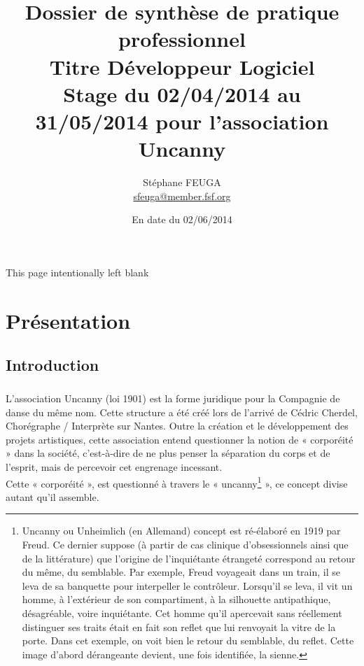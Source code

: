 \documentclass[11pt,a4paper,twoside]{report}
\author{Stéphane FEUGA\\{\small \href{mailto:sfeuga@member.fsf.org}{sfeuga@member.fsf.org}}}
\title{{\Huge Dossier de synthèse de pratique professionnel\\
Titre Développeur Logiciel}\\
{\normalsize Stage du 02/04/2014 au 31/05/2014 pour l'association Uncanny}}
\date {En date du 02/06/2014}
\begin{document}
\maketitle

\begin{center}
This page intentionally left blank
\thispagestyle{empty}
\end{center}

\tableofcontents

\chapter{Présentation}
	\section{Introduction}
		\paragraph*{}L'association Uncanny (loi 1901) est la forme juridique pour la Compagnie de danse du même nom. Cette structure a été créé lors de l'arrivé de Cédric Cherdel, Chorégraphe / Interprète sur Nantes. Outre la création et le développement des projets artistiques, cette association entend questionner la notion de « corporéité » dans la société, c'est-à-dire de ne plus penser la séparation du corps et de l'esprit, mais de percevoir cet engrenage incessant.\\
		Cette « corporéité », est questionné à travers le « uncanny\footnote{Uncanny ou Unheimlich (en Allemand) concept est ré-élaboré en 1919 par Freud. Ce dernier suppose (à partir de cas clinique d'obsessionnels ainsi que de la littérature) que l'origine de l'inquiétante étrangeté correspond au retour du même, du semblable. Par exemple, Freud voyageait dans un train, il se leva de sa banquette pour interpeller le contrôleur. Lorsqu'il se leva, il vit un homme, à l'extérieur de son compartiment, à la silhouette antipathique, désagréable, voire inquiétante. Cet homme qu'il apercevait sans réellement distinguer ses traits était en fait son reflet que lui renvoyait la vitre de la porte. Dans cet exemple, on voit bien le retour du semblable, du reflet. Cette image d'abord dérangeante devient, une fois identifiée, la sienne.} », ce concept divise autant qu'il assemble.
\end{document}
